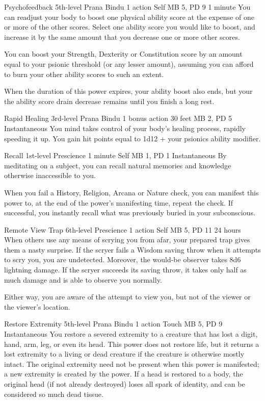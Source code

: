 \DndPowerHeader%
  {Psychofeedback}
  {5th-level Prana Bindu}
  {1 action}
  {Self}
  {MB 5, PD 9}
  {1 minute}
  You can readjust your body to boost one
  physical ability score at the expense of one
  or more of the other scores.
  Select one ability score you would like to boost,
  and increase it by the same amount that you decrease
  one or more other scores.

  You can boost your
  Strength, Dexterity or Constitution score by an
  amount equal to your psionic threshold
  (or any lesser amount),
  assuming you can afford to burn your other ability
  scores to such an extent.
  
  When the duration of this power expires,
  your ability boost also ends,
  but your the ability score drain decrease
  remains until you finish a long rest.

\DndPowerHeader%
  {Rapid Healing}
  {3rd-level Prana Bindu}
  {1 bonus action}
  {30 feet}
  {MB 2, PD 5}
  {Instantaneous}
You mind takes control of your body's healing process,
rapidly speeding it up.
You gain hit points equal to 1d12 + your psionics ability modifier.

\DndPowerHeader%
  {Recall}
  {1st-level Prescience}
  {1 minute}
  {Self}
  {MB 1, PD 1}
  {Instantaneous}
By meditating on a subject, you can recall
natural memories and knowledge otherwise inaccessible to you.

When you fail a History, Religion, Arcana or Nature check,
you can manifest this power to, at the end of the
power's manifesting time, repeat the check.
If successful, you instantly recall
what was previously buried in your subconscious.

\DndPowerHeader%
  {Remote View Trap}
  {6th-level Prescience}
  {1 action}
  {Self}
  {MB 5, PD 11}
  {24 hours}
  When others use any means of scrying you from afar,
  your prepared trap gives them a nasty surprise.
  If the scryer fails a Wisdom saving throw
  when it attempts to scry you,
  you are undetected.
  Moreover, the would-be observer takes 8d6 lightning damage.
  If the scryer succeeds its saving throw,
  it takes only half as much damage
  and is able to observe you normally.
  
  Either way, you are aware of the attempt to view you,
  but not of the viewer or the viewer's location.

\DndPowerHeader%
  {Restore Extremity}
  {5th-level Prana Bindu}
  {1 action}
  {Touch}
  {MB 5, PD 9}
  {Instantaneous}
  You restore a severed extremity to a creature that has
  lost a digit,
  hand,
  arm,
  leg,
  or even its head.
  This power does not restore life,
  but it returns a lost extremity to a living or dead creature
  if the creature is otherwise mostly intact.
  The original extremity need not be present
  when this power is manifested;
  a new extremity is created by the power.
  If a head is restored to a body,
  the original head (if not already destroyed)
  loses all spark of identity,
  and can be considered so much dead tissue.

